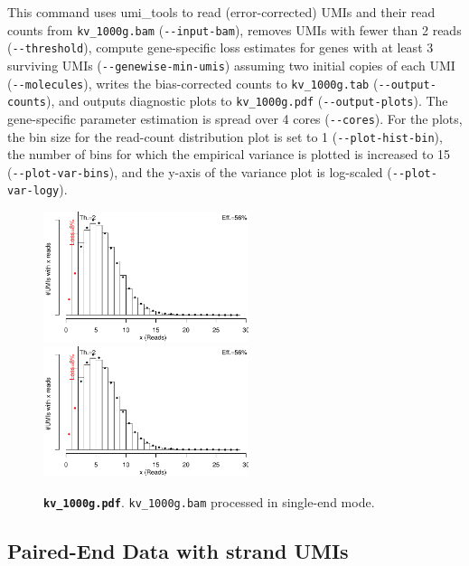 \documentclass[10pt]{article}
\newcommand{\shellscript}[1]{\bgroup\topsep=0pt\partopsep=0pt\shaded%
	\endshaded\egroup}
\newcommand{\ddarg}[1]{\texttt{-{}-#1}}
\begin{document}
\shellscript{../examples/kv_1000g.cmd}

\begin{sloppypar}
This command uses umi\_tools to read (error-corrected) UMIs and their read counts from \texttt{kv\_1000g.bam} (\ddarg{input-bam}), removes UMIs with fewer than 2 reads (\ddarg{threshold}), compute gene-specific loss estimates for genes with at least 3 surviving UMIs (\ddarg{genewise-min-umis}) assuming two initial copies of each UMI (\ddarg{molecules}), writes the bias-corrected counts to \texttt{kv\_1000g.tab} (\ddarg{output-counts}), and outputs diagnostic plots to \texttt{kv\_1000g.pdf} (\ddarg{output-plots}). The gene-specific parameter estimation is spread over 4 cores (\ddarg{cores}). For the plots, the bin size for the read-count distribution plot is set to 1 (\ddarg{plot-hist-bin}), the number of bins for which the empirical variance is plotted is increased to 15 (\ddarg{plot-var-bins}), and the y-axis of the variance plot is log-scaled (\ddarg{plot-var-logy}).
\end{sloppypar}

\begin{figure}[H]
{\centering
\includegraphics[width=6cm,page=1]{../examples/kv_1000g.pdf}
\includegraphics[width=6cm,page=2]{../examples/kv_1000g.pdf}
\\}
\caption*{\textbf{\texttt{kv\_1000g.pdf}}. \texttt{kv\_1000g.bam} processed in single-end mode.}
\end{figure}

\subsection{Paired-End Data with strand UMIs}
\end{document}
